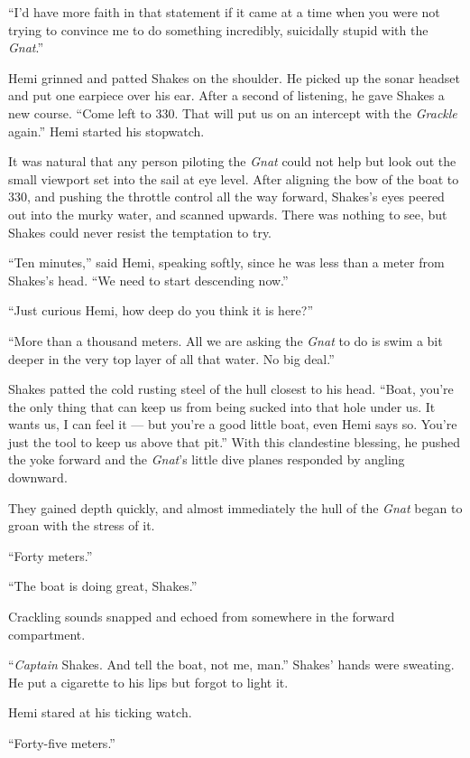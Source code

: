 \documentclass[
]{scrbook}
\begin{document}
``I'd have more faith in that statement if it came at a time when you
were not trying to convince me to do something incredibly, suicidally
stupid with the \emph{Gnat}.''

Hemi grinned and patted Shakes on the shoulder. He picked up the sonar
headset and put one earpiece over his ear. After a second of listening,
he gave Shakes a new course. ``Come left to 330. That will put us on an
intercept with the \emph{Grackle} again.'' Hemi started his stopwatch.

It was natural that any person piloting the \emph{Gnat} could not help
but look out the small viewport set into the sail at eye level. After
aligning the bow of the boat to 330, and pushing the throttle control
all the way forward, Shakes's eyes peered out into the murky water, and
scanned upwards. There was nothing to see, but Shakes could never resist
the temptation to try.

``Ten minutes,'' said Hemi, speaking softly, since he was less than a
meter from Shakes's head. ``We need to start descending now.''

``Just curious Hemi, how deep do you think it is here?''

``More than a thousand meters. All we are asking the \emph{Gnat} to do
is swim a bit deeper in the very top layer of all that water. No big
deal.''

Shakes patted the cold rusting steel of the hull closest to his head.
``Boat, you're the only thing that can keep us from being sucked into
that hole under us. It wants us, I can feel it --- but you're a good
little boat, even Hemi says so. You're just the tool to keep us above
that pit.'' With this clandestine blessing, he pushed the yoke forward
and the \emph{Gnat}'s little dive planes responded by angling downward.

They gained depth quickly, and almost immediately the hull of the
\emph{Gnat} began to groan with the stress of it.

``Forty meters.''

``The boat is doing great, Shakes.''

Crackling sounds snapped and echoed from somewhere in the forward
compartment.

``\emph{Captain} Shakes. And tell the boat, not me, man.'' Shakes' hands
were sweating. He put a cigarette to his lips but forgot to light it.

Hemi stared at his ticking watch.

``Forty-five meters.''
\end{document}
